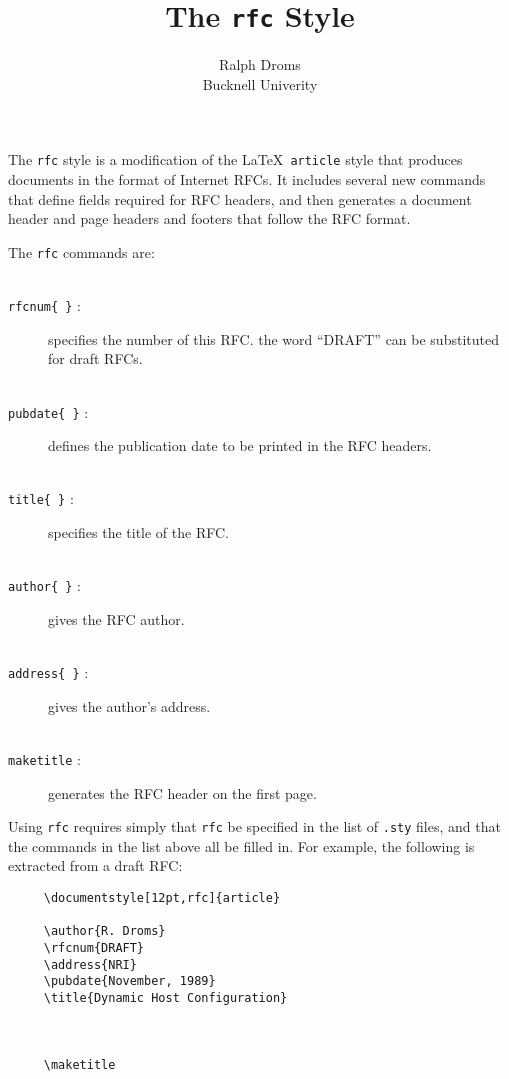 
\title{The {\tt rfc} Style}
\author{Ralph Droms \\ Bucknell Univerity}


\maketitle

The {\tt rfc} style is a modification of the \LaTeX\ {\tt article}
style that produces documents in the format of Internet RFCs. It
includes several new commands that define fields required for RFC
headers, and then generates a document header and page headers and
footers that follow the RFC format.

The {\tt rfc} commands are:
\begin{description}
\item[{\tt \\rfcnum\{ \}} :] specifies the number of this RFC.  the word
``DRAFT'' can be substituted for draft RFCs.
\item[{\tt \\pubdate\{ \}} :] defines the publication date to be printed in
the RFC headers.
\item[{\tt \\title\{ \}} :] specifies the title of the RFC.
\item[{\tt \\author\{ \}} :] gives the RFC author.
\item[{\tt \\address\{ \}} :] gives the author's address.
\item[{\tt \\maketitle} :] generates the RFC header on the first page.
\end{description}
\newpage
Using {\tt rfc} requires simply that {\tt rfc} be specified in the
list of {\tt .sty} files, and that the commands in the list above all
be filled in.  For example, the following is extracted from a draft
RFC:

\begin{verbatim}
     \documentstyle[12pt,rfc]{article}

     \author{R. Droms}
     \rfcnum{DRAFT}
     \address{NRI}
     \pubdate{November, 1989}
     \title{Dynamic Host Configuration}

     

     \maketitle

\end{verbatim}
